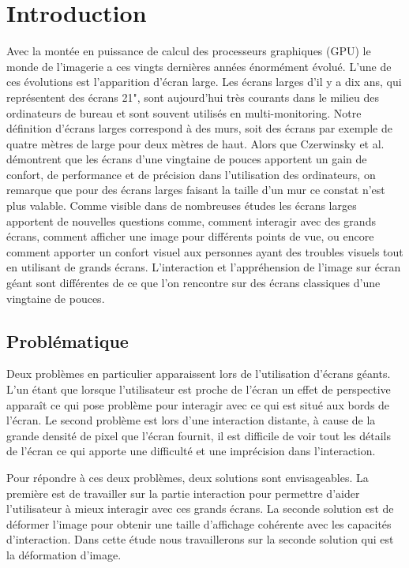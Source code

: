 \chapter{Introduction}

Avec la montée en puissance de calcul des processeurs graphiques (GPU) le monde de l'imagerie a ces vingts dernières années énormément évolué. L'une de ces évolutions est l'apparition d'écran large. Les écrans larges d'il y a dix ans, qui représentent des écrans 21"\cite{Czerwinski:2006:LDR:1125451.1125471}, sont aujourd'hui très courants dans le milieu des ordinateurs de bureau et sont souvent utilisés en multi-monitoring. Notre définition d'écrans larges correspond à des murs, soit des écrans par exemple de quatre mètres de large pour deux mètres de haut. Alors que Czerwinsky et al.\cite{czerwinski2003toward} démontrent que les écrans d'une vingtaine de pouces apportent un gain de confort, de performance et de précision dans l'utilisation des ordinateurs, on remarque que pour des écrans larges faisant la taille d'un mur ce constat n'est plus valable. Comme visible dans de nombreuses études \cite{Schmidt:2013:SEP:2470654.2466227, Vogel:2004:IPA:1029632.1029656, jakobsen2013information} les écrans larges apportent de nouvelles questions comme, comment interagir avec des grands écrans, comment afficher une image pour différents points de vue, ou encore comment apporter un confort visuel aux personnes ayant des troubles visuels tout en utilisant de grands écrans. L'interaction et l'appréhension de l'image sur écran géant sont différentes de ce que l'on rencontre sur des écrans classiques d'une vingtaine de pouces.

\section{Problématique} 

Deux problèmes en particulier apparaissent lors de l'utilisation d'écrans géants. L'un étant que lorsque l'utilisateur est proche de l'écran un effet de perspective apparaît ce qui pose problème pour interagir avec ce qui est situé aux bords de l'écran. Le second problème est lors d'une interaction distante, à cause de la grande densité de pixel que l'écran fournit, il est difficile de voir tout les détails de l'écran ce qui apporte une difficulté et une imprécision dans l'interaction.

Pour répondre à ces deux problèmes, deux solutions sont envisageables. La première est de travailler sur la partie interaction pour permettre d'aider l'utilisateur à mieux interagir avec ces grands écrans. La seconde solution est de déformer l'image pour obtenir une taille d'affichage cohérente avec les capacités d'interaction. Dans cette étude nous travaillerons sur la seconde solution qui est la déformation d'image.

